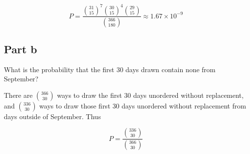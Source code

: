 \documentclass{article}
\begin{document}
\[
P = \frac{\binom{31}{15}^7 \binom{30}{15}^4 \binom{29}{15}}{\binom{366}{180}}
\approx 1.67 \times 10^{-9}
\]

\subsection*{Part b}

What is the probability that the first 30 days drawn contain none from September?

There are $\binom{366}{30}$ ways to draw the first 30 days unordered without replacement, and $\binom{336}{30}$ ways to draw those first 30 days unordered without replacement from days outside of September. Thus

\[
P = \frac{\binom{336}{30}}{\binom{366}{30}}
\]
\end{document}

